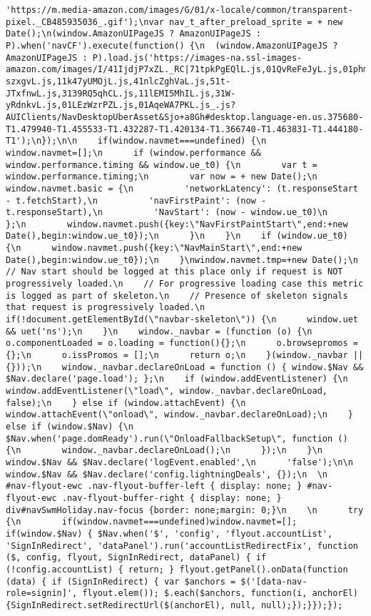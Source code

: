\documentclass[
]{article}
\begin{document}
\begin{verbatim}
'https://m.media-amazon.com/images/G/01/x-locale/common/transparent-pixel._CB485935036_.gif');\nvar nav_t_after_preload_sprite = + new Date();\n(window.AmazonUIPageJS ? AmazonUIPageJS : P).when('navCF').execute(function() {\n  (window.AmazonUIPageJS ? AmazonUIPageJS : P).load.js('https://images-na.ssl-images-amazon.com/images/I/41IjdjP7xZL._RC|71tpkPgEQlL.js,01QvReFeJyL.js,01phmzCOwJL.js,01eOvPdxG7L.js,61proBBYkaL.js,41gNKoK0s7L.js,115pV8Rl02L.js,21QA-szxgvL.js,11k47yUMOjL.js,41nlcZghVaL.js,51t-JTxfnwL.js,3139RQ5qhCL.js,11lEMI5MhIL.js,31W-yRdnkvL.js,01LEzWzrPZL.js,01AqeWA7PKL.js_.js?AUIClients/NavDesktopUberAsset&Sjo+a8Gh#desktop.language-en.us.375680-T1.479940-T1.455533-T1.432287-T1.420134-T1.366740-T1.463831-T1.444180-T1');\n});\n\n    if(window.navmet===undefined) {\n      window.navmet=[];\n      if (window.performance && window.performance.timing && window.ue_t0) {\n        var t = window.performance.timing;\n        var now = + new Date();\n        window.navmet.basic = {\n          'networkLatency': (t.responseStart - t.fetchStart),\n          'navFirstPaint': (now - t.responseStart),\n          'NavStart': (now - window.ue_t0)\n        };\n        window.navmet.push({key:\"NavFirstPaintStart\",end:+new Date(),begin:window.ue_t0});\n      }\n    }\n    if (window.ue_t0) {\n      window.navmet.push({key:\"NavMainStart\",end:+new Date(),begin:window.ue_t0});\n    }\nwindow.navmet.tmp=+new Date();\n    // Nav start should be logged at this place only if request is NOT progressively loaded.\n    // For progressive loading case this metric is logged as part of skeleton.\n    // Presence of skeleton signals that request is progressively loaded.\n    if(!document.getElementById(\"navbar-skeleton\")) {\n      window.uet && uet('ns');\n    }\n    window._navbar = (function (o) {\n      o.componentLoaded = o.loading = function(){};\n      o.browsepromos = {};\n      o.issPromos = [];\n      return o;\n    }(window._navbar || {}));\n    window._navbar.declareOnLoad = function () { window.$Nav && $Nav.declare('page.load'); };\n    if (window.addEventListener) {\n      window.addEventListener(\"load\", window._navbar.declareOnLoad, false);\n    } else if (window.attachEvent) {\n      window.attachEvent(\"onload\", window._navbar.declareOnLoad);\n    } else if (window.$Nav) {\n      $Nav.when('page.domReady').run(\"OnloadFallbackSetup\", function () {\n        window._navbar.declareOnLoad();\n      });\n    }\n    window.$Nav && $Nav.declare('logEvent.enabled',\n      'false');\n\n    window.$Nav && $Nav.declare('config.lightningDeals', {});\n  \n       #nav-flyout-ewc .nav-flyout-buffer-left { display: none; } #nav-flyout-ewc .nav-flyout-buffer-right { display: none; } div#navSwmHoliday.nav-focus {border: none;margin: 0;}\n    \n      try {\n        if(window.navmet===undefined)window.navmet=[]; if(window.$Nav) { $Nav.when('$', 'config', 'flyout.accountList', 'SignInRedirect', 'dataPanel').run('accountListRedirectFix', function ($, config, flyout, SignInRedirect, dataPanel) { if (!config.accountList) { return; } flyout.getPanel().onData(function (data) { if (SignInRedirect) { var $anchors = $('[data-nav-role=signin]', flyout.elem()); $.each($anchors, function(i, anchorEl) {SignInRedirect.setRedirectUrl($(anchorEl), null, null);});}});}); 
\end{verbatim}
\end{document}
